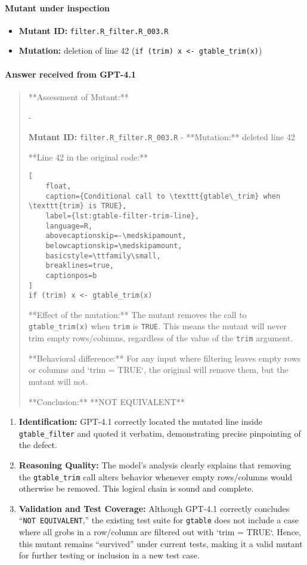 \paragraph{Mutant under inspection}
\begin{itemize}
  \item \textbf{Mutant ID:} \texttt{filter.R\_filter.R\_003.R}
  \item \textbf{Mutation:} deletion of line 42 (\texttt{if (trim) x <- gtable\_trim(x)})
\end{itemize}

\paragraph{Answer received from GPT-4.1}
\begin{quote}
**Assessment of Mutant:**

-   \item \textbf{Mutant ID:} \texttt{filter.R\_filter.R\_003.R}  
- **Mutation:** deleted line 42

**Line 42 in the original code:**
\begin{lstlisting}[
    float,
    caption={Conditional call to \texttt{gtable\_trim} when \texttt{trim} is TRUE},
    label={lst:gtable-filter-trim-line},
    language=R,
    abovecaptionskip=-\medskipamount,
    belowcaptionskip=\medskipamount,
    basicstyle=\ttfamily\small,
    breaklines=true,
    captionpos=b
]
if (trim) x <- gtable_trim(x)
\end{lstlisting}


**Effect of the mutation:**  
The mutant removes the call to \texttt{gtable\_trim(x)} when \texttt{trim} is \texttt{TRUE}. This means the mutant will never trim empty rows/columns, regardless of the value of the \texttt{trim} argument.

**Behavioral difference:**  
For any input where filtering leaves empty rows or columns and `trim = TRUE`, the original will remove them, but the mutant will not.

**Conclusion:**  
**NOT EQUIVALENT**
\end{quote}

\begin{enumerate}
  \item \textbf{Identification:}  
    GPT-4.1 correctly located the mutated line inside \texttt{gtable\_filter} and quoted it verbatim, demonstrating precise pinpointing of the defect.
  
     \item \textbf{Reasoning Quality:}  
    The model’s analysis clearly explains that removing the \texttt{gtable\_trim} call alters behavior whenever empty rows/columns would otherwise be removed. This logical chain is sound and complete.


  \item \textbf{Validation and Test Coverage:}  
    Although GPT-4.1 correctly concludes “\texttt{NOT EQUIVALENT},” the existing test suite for \texttt{gtable} does not include a case where all grobs in a row/column are filtered out with `trim = TRUE`.  Hence, this mutant remains “survived” under current tests, making it a valid mutant for further testing or inclusion in a new test case.
\end{enumerate}

